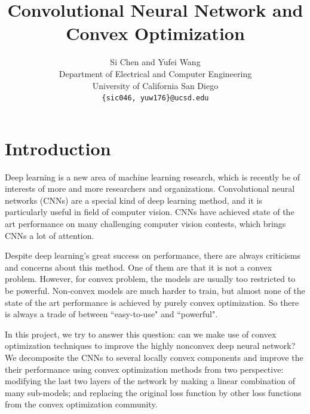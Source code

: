 \documentclass{article} %
\title{Convolutional Neural Network and Convex Optimization}
\author{
Si Chen  and   Yufei Wang\\
Department of Electrical and Computer Engineering\\
University of California San Diego\\
\texttt{\{sic046, yuw176\}@ucsd.edu}          \\
}
\begin{document}
\maketitle
\begin{abstract}

\end{abstract}
\section{Introduction}

Deep learning is a new area of machine learning research, which is recently be of interests of more and more researchers and organizations. Convolutional neural networks (CNNs) are a special kind of deep learning method, and it is particularly useful in field of computer vision. CNNs have achieved state of the art performance on many challenging computer vision contests, which brings CNNs a lot of attention.
\par
Despite deep learning's great success on performance, there are always criticisms and concerns about this method. One of them are that it is not a convex problem. However, for convex problem, the models are usually too restricted to be powerful. Non-convex models are much harder to train, but almost none of the state of the art performance is achieved by purely convex optimization. So there is always a trade of between ``easy-to-use" and ``powerful". \par
In this project, we try to answer this question: can we make use of convex optimization techniques to improve the highly nonconvex deep neural network? We decomposite the CNNs to several locally convex components and improve the their performance using convex optimization methods from two perspective: modifying the last two layers of the network by making a linear combination of many sub-models; and replacing the original loss function by other loss functions from the convex
optimization community.
\end{document}
